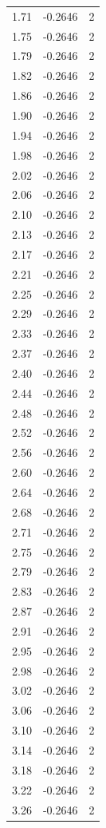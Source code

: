 \begin{longtable}{lrr}
  1.71 & -0.2646 & 2 \\
  1.75 & -0.2646 & 2 \\
  1.79 & -0.2646 & 2 \\
  1.82 & -0.2646 & 2 \\
  1.86 & -0.2646 & 2 \\
  1.90 & -0.2646 & 2 \\
  1.94 & -0.2646 & 2 \\
  1.98 & -0.2646 & 2 \\
  2.02 & -0.2646 & 2 \\
  2.06 & -0.2646 & 2 \\
  2.10 & -0.2646 & 2 \\
  2.13 & -0.2646 & 2 \\
  2.17 & -0.2646 & 2 \\
  2.21 & -0.2646 & 2 \\
  2.25 & -0.2646 & 2 \\
  2.29 & -0.2646 & 2 \\
  2.33 & -0.2646 & 2 \\
  2.37 & -0.2646 & 2 \\
  2.40 & -0.2646 & 2 \\
  2.44 & -0.2646 & 2 \\
  2.48 & -0.2646 & 2 \\
  2.52 & -0.2646 & 2 \\
  2.56 & -0.2646 & 2 \\
  2.60 & -0.2646 & 2 \\
  2.64 & -0.2646 & 2 \\
  2.68 & -0.2646 & 2 \\
  2.71 & -0.2646 & 2 \\
  2.75 & -0.2646 & 2 \\
  2.79 & -0.2646 & 2 \\
  2.83 & -0.2646 & 2 \\
  2.87 & -0.2646 & 2 \\
  2.91 & -0.2646 & 2 \\
  2.95 & -0.2646 & 2 \\
  2.98 & -0.2646 & 2 \\
  3.02 & -0.2646 & 2 \\
  3.06 & -0.2646 & 2 \\
  3.10 & -0.2646 & 2 \\
  3.14 & -0.2646 & 2 \\
  3.18 & -0.2646 & 2 \\
  3.22 & -0.2646 & 2 \\
  3.26 & -0.2646 & 2 \\

\end{longtable}
